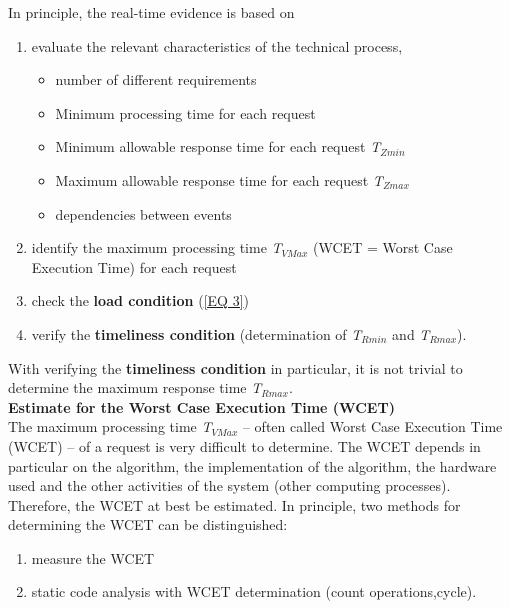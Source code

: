 In principle, the real-time evidence is based on

\begin{enumerate}
	\item  evaluate the relevant characteristics of the technical process,
	\begin{itemize}
		\item  number of different requirements
		\item  Minimum processing time for each request
		\item  Minimum allowable response time for each request \textit{T${}_{Zmin}$}
		\item  Maximum allowable response time for each request \textit{T${}_{Zmax}$}
		\item  dependencies between events
	\end{itemize}
	\item  identify the maximum processing time \textit{T${}_{VMax}$} (WCET = Worst Case Execution Time) for each request
	\item  check the\textbf{ load condition} (\ref{EQ 3})
	\item  verify the \textbf{timeliness condition} (determination of \textit{T${}_{Rmin}$} and \textit{T${}_{Rmax}$}).
\end{enumerate}

With verifying the \textbf{timeliness condition} in particular, it is not trivial to determine the maximum response time \textit{T${}_{Rmax}$}.\\

{\rot\bf Estimate for the Worst Case Execution Time (WCET)}\\

The maximum processing time \textit{T${}_{VMax}$} -- often called Worst Case Execution Time (WCET) -- of a request is very difficult to determine. The WCET depends in particular on the algorithm, the implementation of the algorithm, the hardware used and the other activities of the system (other computing processes). \\

Therefore, the WCET at best be estimated. In principle, two methods for determining the WCET can be distinguished:

\begin{enumerate}
	\item  measure the WCET 
	\item  static code analysis with WCET determination (count operations,cycle).
\end{enumerate}

